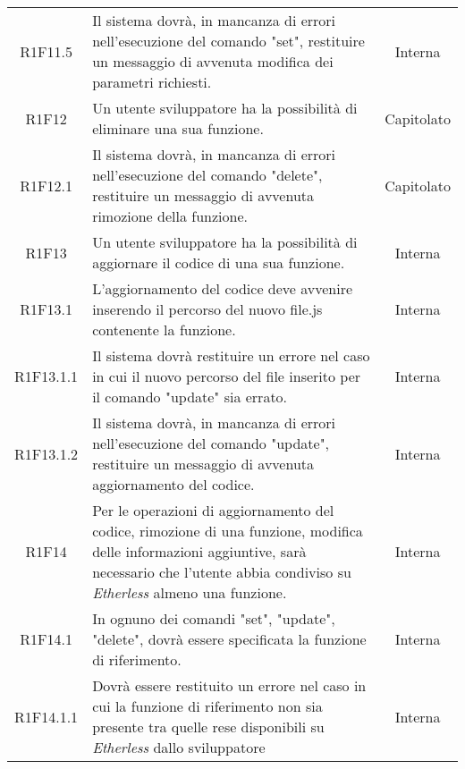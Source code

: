 \begin{longtable}{|c|p{8cm}|c|}
	R1F11.5 &  Il sistema dovrà, in mancanza di errori nell'esecuzione del comando "set", restituire un messaggio di avvenuta modifica dei parametri richiesti. & Interna \\
	
	R1F12 &  Un utente sviluppatore ha la possibilità di eliminare una sua funzione. & Capitolato \\
	
	R1F12.1 & Il sistema dovrà, in mancanza di errori nell'esecuzione del comando "delete", restituire un messaggio di avvenuta rimozione della funzione. & Capitolato\\
	
	R1F13 &  Un utente sviluppatore ha la possibilità di aggiornare il codice di una sua funzione. & Interna \\
	
	R1F13.1 &  L'aggiornamento del codice deve avvenire inserendo il percorso del nuovo file.js contenente la funzione. & Interna \\
	
	R1F13.1.1 & Il sistema dovrà restituire un errore nel caso in cui il nuovo percorso del file inserito per il comando "update" sia errato. & Interna\\
	
	R1F13.1.2 & Il sistema dovrà, in mancanza di errori nell'esecuzione del comando "update", restituire un messaggio di avvenuta aggiornamento del codice. & Interna\\
	
	R1F14 &  Per le operazioni di aggiornamento del codice, rimozione di una funzione, modifica delle informazioni aggiuntive, sarà necessario che l'utente abbia condiviso su \textit{Etherless} almeno una funzione. & Interna \\
	
	R1F14.1 &  In ognuno dei comandi "set", "update", "delete", dovrà essere specificata la funzione di riferimento. & Interna \\
	
	R1F14.1.1 &  Dovrà essere restituito un errore nel caso in cui la funzione di riferimento non sia presente tra quelle rese disponibili su \textit{Etherless} dallo sviluppatore & Interna \\
	\hline
	
\end{longtable}